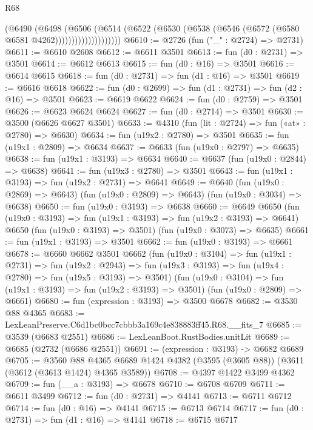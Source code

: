 \begin{lexlean}{R68}
\begin{coremodule}
                        (@6490
                          (@6498
                            (@6506
                              (@6514
                                (@6522
                                  (@6530 (@6538 (@6546 (@6572 (@6580 @6581 @4262))))))))))))))))))))
@6610 := @2726 (fun ("_" : @2724) => @2731)
@6611 := @6610 @2608
@6612 := @6611 @3501
@6613 := fun (d0 : @2731) => @3501
@6614 := @6612 @6613
@6615 := fun (d0 : @16) => @3501
@6616 := @6614 @6615
@6618 := fun (d0 : @2731) => fun (d1 : @16) => @3501
@6619 := @6616 @6618
@6622 := fun (d0 : @2699) => fun (d1 : @2731) => fun (d2 : @16) => @3501
@6623 := @6619 @6622
@6624 := fun (d0 : @2759) => @3501
@6626 := @6623 @6624 @6624
@6627 := fun (d0 : @2714) => @3501
@6630 := @3500 (@6626 @6627 @3501)
@6633 := @4310 (fun (lit : @2724) => fun («at» : @2780) => @6630)
@6634 := fun (u19x2 : @2780) => @3501
@6635 := fun (u19x1 : @2809) => @6634
@6637 := @6633 (fun (u19x0 : @2797) => @6635)
@6638 := fun (u19x1 : @3193) => @6634
@6640 := @6637 (fun (u19x0 : @2844) => @6638)
@6641 := fun (u19x3 : @2780) => @3501
@6643 := fun (u19x1 : @3193) => fun (u19x2 : @2731) => @6641
@6649 := @6640
    (fun (u19x0 : @2869) => @6643)
    (fun (u19x0 : @2809) => @6643)
    (fun (u19x0 : @3034) => @6638)
@6650 := fun (u19x0 : @3193) => @6638
@6660 := @6649
    @6650
    (fun (u19x0 : @3193) => fun (u19x1 : @3193) => fun (u19x2 : @3193) => @6641)
    @6650
    (fun (u19x0 : @3193) => @3501)
    (fun (u19x0 : @3073) => @6635)
@6661 := fun (u19x1 : @3193) => @3501
@6662 := fun (u19x0 : @3193) => @6661
@6678 := @6660
    @6662
    @3501
    @6662
    (fun (u19x0 : @3104) =>
    fun (u19x1 : @2731) =>
    fun (u19x2 : @2943) =>
    fun (u19x3 : @3193) => fun (u19x4 : @2780) => fun (u19x5 : @3193) => @3501)
    (fun (u19x0 : @3104) => fun (u19x1 : @3193) => fun (u19x2 : @3193) => @3501)
    (fun (u19x0 : @2809) => @6661)
@6680 := fun (expression : @3193) => @3500 @6678
@6682 := @3530 @88 @4365
@6683 := LexLeanPreserve.C6d1bc0bcc7cbbb3a169c4e838883ff45.R68.__fits_7
@6685 := @3539 (@6683 @2551)
@6686 := LexLeanBoot.RustBodies.unitLit
@6689 := @6685 (@2732 (@6686 @2551))
@6691 := (expression : @3193) -> @6682 @6689
@6705 := @3560
    @88
    @4365
    @6689
    @1424
    @4382
    (@3595 (@3605 @88))
    (@3611 (@3612 (@3613 @1424) @4365 @3589))
@6708 := @4397 @1422 @3499 @4362
@6709 := fun (__a : @3193) => @6678
@6710 := @6708 @6709
@6711 := @6611 @3499
@6712 := fun (d0 : @2731) => @4141
@6713 := @6711 @6712
@6714 := fun (d0 : @16) => @4141
@6715 := @6713 @6714
@6717 := fun (d0 : @2731) => fun (d1 : @16) => @4141
@6718 := @6715 @6717

\end{coremodule}
\end{lexlean}
